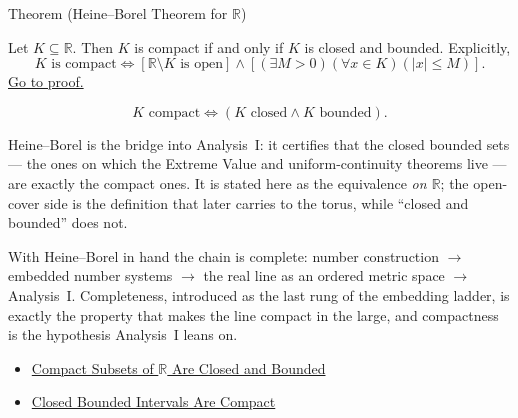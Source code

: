 \begin{theorembox}{Theorem (Heine--Borel Theorem for $\mathbb{R}$)}
\begin{theorem}
\label{thm:heine-borel}
Let $K\subseteq\mathbb{R}$.  Then $K$ is compact if and only if $K$ is closed
and bounded.  Explicitly,
\[
  K\text{ is compact}
  \Longleftrightarrow
  \left[
  \mathbb{R}\setminus K\text{ is open}
  \right]
  \land
  \left[
  (\exists M>0)(\forall x\in K)(|x|\leq M)
  \right].
\]
\hyperref[prf:heine-borel]{Go to proof.}
\end{theorem}
\end{theorembox}
\begin{remark*}
\[
K \text{ compact} \Longleftrightarrow (K \text{ closed} \land K \text{ bounded}).
\]
\end{remark*}
\begin{remark*}[Interpretation]
Heine--Borel is the bridge into Analysis~I: it certifies that the closed bounded sets --- the ones on which the Extreme Value and uniform-continuity theorems live --- are exactly the compact ones. It is stated here as the equivalence \emph{on $\mathbb{R}$}; the open-cover side is the definition that later carries to the torus, while ``closed and bounded'' does not.
\end{remark*}
\begin{remark*}[Exposition]
With Heine--Borel in hand the chain is complete: number construction $\to$ embedded number systems $\to$ the real line as an ordered metric space $\to$ Analysis~I. Completeness, introduced as the last rung of the embedding ladder, is exactly the property that makes the line compact in the large, and compactness is the hypothesis Analysis~I leans on.
\end{remark*}
\begin{dependencies}
\begin{itemize}
  \item \hyperref[thm:compact-implies-closed-bounded]{Compact Subsets of $\mathbb{R}$ Are Closed and Bounded}
  \item \hyperref[thm:closed-bounded-interval-compact]{Closed Bounded Intervals Are Compact}
\end{itemize}
\end{dependencies}
